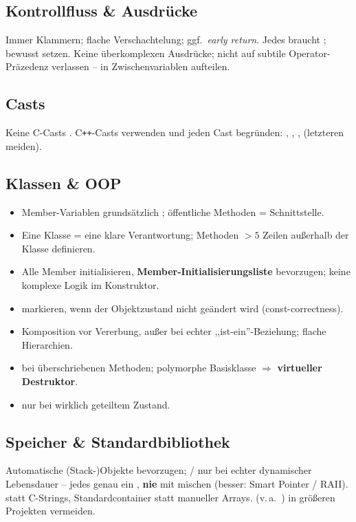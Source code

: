 \subsection{Kontrollfluss \& Ausdr\"ucke}
Immer Klammern; flache Verschachtelung; ggf.\ \emph{early return}. Jedes  braucht ;  bewusst setzen. Keine \"uberkomplexen Ausdr\"ucke; nicht auf subtile Operator-Pr\"azedenz verlassen -- in Zwischenvariablen aufteilen.

\subsection{Casts}
Keine C-Casts . C\texttt{++}-Casts verwenden und jeden Cast begr\"unden: , , ,  (letzteren meiden).

\subsection{Klassen \& OOP}
\begin{itemize}
  \item Member-Variablen grunds\"atzlich ; \"offentliche Methoden = Schnittstelle.
  \item Eine Klasse = eine klare Verantwortung; Methoden $>5$ Zeilen au\ss erhalb der Klasse definieren.
  \item Alle Member initialisieren, \textbf{Member-Initialisierungsliste} bevorzugen; keine komplexe Logik im Konstruktor.
  \item {} markieren, wenn der Objektzustand nicht ge\"andert wird (const-correctness).
  \item Komposition vor Vererbung, au\ss er bei echter ,,ist-ein''-Beziehung; flache Hierarchien.
  \item {} bei \"uberschriebenen Methoden; polymorphe Basisklasse $\Rightarrow$ \textbf{virtueller Destruktor}.
  \item {} nur bei wirklich geteiltem Zustand.
\end{itemize}

\subsection{Speicher \& Standardbibliothek}
Automatische (Stack-)Objekte bevorzugen; / nur bei echter dynamischer Lebensdauer -- jedes  genau ein , \textbf{nie}  mit  mischen (besser: Smart Pointer / RAII).  statt C-Strings, Standardcontainer statt manueller Arrays.  (v.\,a.\ ) in gr\"o\ss eren Projekten vermeiden.

